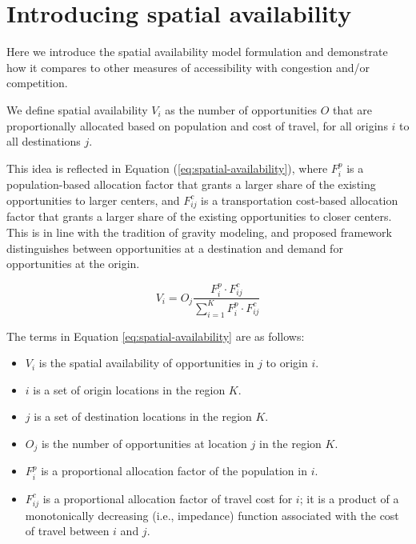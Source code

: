 \documentclass[]{elsarticle} %
\providecommand{\tightlist}{%
  \setlength{\itemsep}{0pt}\setlength{\parskip}{0pt}}
\begin{document}
\hypertarget{introducing-spatial-availability}{%
\section{Introducing spatial
availability}\label{introducing-spatial-availability}}

Here we introduce the spatial availability model formulation and
demonstrate how it compares to other measures of accessibility with
congestion and/or competition.

We define spatial availability \(V_{i}\) as the number of opportunities
\(O\) that are proportionally allocated based on population and cost of
travel, for all origins \(i\) to all destinations \(j\).

This idea is reflected in Equation (\ref{eq:spatial-availability}),
where \(F^p_{i}\) is a population-based allocation factor that grants a
larger share of the existing opportunities to larger centers, and
\(F^c_{ij}\) is a transportation cost-based allocation factor that
grants a larger share of the existing opportunities to closer centers.
This is in line with the tradition of gravity modeling, and proposed
framework distinguishes between opportunities at a destination and
demand for opportunities at the origin.

\begin{equation}
\label{eq:spatial-availability}
V_{i} = O_j\frac{F^p_{i} \cdot F^c_{ij}}{\sum_{i=1}^K F^p_{i} \cdot F^c_{ij}}
\end{equation}

The terms in Equation \ref{eq:spatial-availability} are as follows:

\begin{itemize}
\tightlist
\item
  \(V_{i}\) is the spatial availability of opportunities in \(j\) to
  origin \(i\).
\item
  \(i\) is a set of origin locations in the region \(K\).
\item
  \(j\) is a set of destination locations in the region \(K\).
\item
  \(O_j\) is the number of opportunities at location \(j\) in the region
  \(K\).
\item
  \(F^p_{i}\) is a proportional allocation factor of the population in
  \(i\).
\item
  \(F^c_{ij}\) is a proportional allocation factor of travel cost for
  \(i\); it is a product of a monotonically decreasing (i.e., impedance)
  function associated with the cost of travel between \(i\) and \(j\).
\end{itemize}
\end{document}
